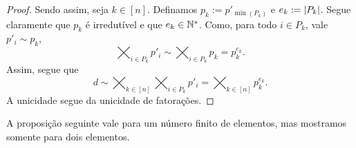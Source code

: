 \begin{proof}
Sendo assim, seja $k \in [n]$. Definamos $p_k := p'_{\min(P_k)}$ e $e_k := \left\vert{P_k}\right\vert$. Segue claramente que $p_k$ é irredutível e que $e_k \in \mathbb{N}^*$. Como, para todo $i \in P_k$, vale $p'_i \sim p_k$, 
	\begin{equation*}
	\bigtimes_{i \in P_k} p'_i \sim \bigtimes_{i \in P_k} p_k = p_k^{e_k}.
	\end{equation*}
Assim, segue que
	\begin{equation*}
	d \sim \bigtimes_{k \in [n]} \bigtimes_{i \in P_k} p'_i = \bigtimes_{k \in [n]} p_k^{e_k}.
	\end{equation*}
A unicidade segue da unicidade de fatorações.
\end{proof}

A proposição seguinte vale para um número finito de elementos, mas mostramos somente para dois elementos.

